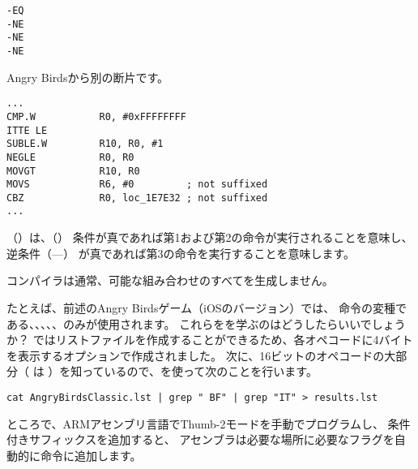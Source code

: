 \begin{lstlisting}
-EQ
-NE
-NE
-NE
\end{lstlisting}

Angry Birdsから別の断片です。

\begin{lstlisting}[caption=Angry Birds Classic,style=customasmARM]
...
CMP.W           R0, #0xFFFFFFFF
ITTE LE
SUBLE.W         R10, R0, #1
NEGLE           R0, R0
MOVGT           R10, R0
MOVS            R6, #0         ; not suffixed
CBZ             R0, loc_1E7E32 ; not suffixed
...
\end{lstlisting}

（）は、（）
条件が真であれば第1および第2の命令が実行されることを意味し、逆条件（---）
が真であれば第3の命令を実行することを意味します。

コンパイラは通常、可能な組み合わせのすべてを生成しません。

たとえば、前述のAngry Birdsゲーム（iOSのバージョン）では、
命令の変種である、、、、、のみが使用されます。 
\myindex{\GrepUsage}
これらをを学ぶのはどうしたらいいでしょうか？
\IDA ではリストファイルを作成することができるため、各オペコードに4バイトを表示するオプションで作成されました。 
次に、16ビットのオペコードの大部分（ は ）を知っているので、を使って次のことを行います。

\begin{lstlisting}
cat AngryBirdsClassic.lst | grep " BF" | grep "IT" > results.lst
\end{lstlisting}


ところで、ARMアセンブリ言語でThumb-2モードを手動でプログラムし、
条件付きサフィックスを追加すると、
アセンブラは必要な場所に必要なフラグを自動的に命令に追加します。

\myparagraph{\NonOptimizingXcodeIV (\ARMMode)}

